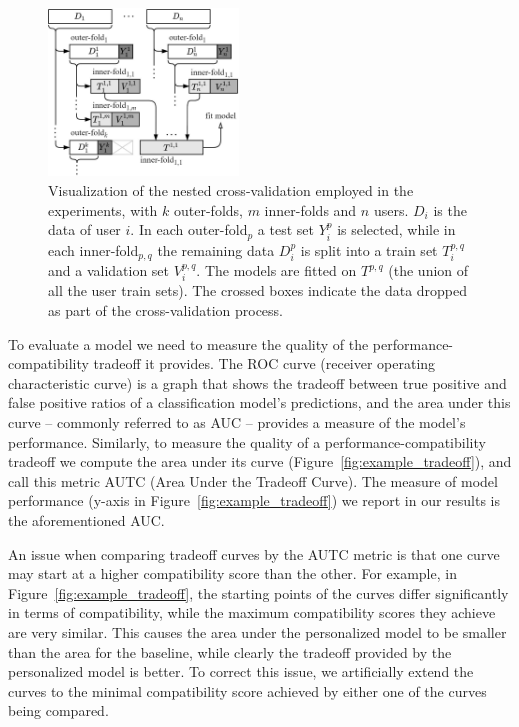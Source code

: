 \documentclass[letterpaper]{article} %
\theoremstyle{definition}
\begin{document}

\begin{figure}[t]
     \centering
     \includegraphics[width=0.45\textwidth]{cross_validation}
     \caption{Visualization of the nested cross-validation employed in the experiments, with $k$ outer-folds, $m$ inner-folds and $n$ users. $D_i$ is the data of user $i$. In each outer-fold$_p$ a test set $Y_i^p$ is selected, while in each inner-fold$_{p,q}$ the remaining data $D_i^p$ is split into a train set $T_i^{p,q}$ and a validation set $V_i^{p,q}$. The models are fitted on $T^{p,q}$ (the union of all the user train sets). The crossed boxes indicate the data dropped as part of the cross-validation process.}
    \label{fig:cross_validation}
\end{figure}
%

To evaluate a model we need to measure the quality of the performance-compatibility tradeoff it provides.
The  ROC curve (receiver operating characteristic curve) is a graph that shows the tradeoff between true positive and false positive ratios of a classification model's predictions, and the area under this curve -- commonly referred to as AUC -- provides a measure of the model's performance.
 Similarly, to measure the quality of a performance-compatibility tradeoff we compute the  area under its curve (Figure~\ref{fig:example_tradeoff}), and call this metric AUTC (Area Under the Tradeoff Curve). The measure of model performance (y-axis in Figure~\ref{fig:example_tradeoff}) we report in our results is the aforementioned AUC.

An issue when comparing tradeoff curves by the AUTC metric is that one curve may start at a higher compatibility score than the other.
For example, in Figure~\ref{fig:example_tradeoff}, the starting points of the curves differ significantly in terms of compatibility, while the maximum compatibility scores they achieve are very similar.
This causes the area under the personalized model to be smaller than the area for the baseline, while clearly the tradeoff provided by the personalized model is better.
To correct this issue, we artificially extend the curves to the minimal compatibility score achieved by either one of the curves being compared.
\end{document}
